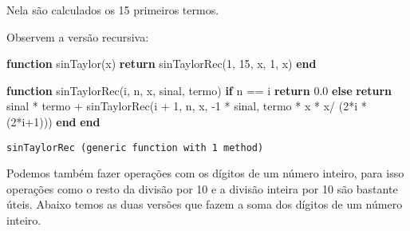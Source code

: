 \documentclass[
  letterpaper,
  DIV=11,
  numbers=noendperiod]{scrreprt}
\newenvironment{Shaded}{\begin{snugshade}}{\end{snugshade}}
\newcommand{\ControlFlowTok}[1]{\textcolor[rgb]{0.00,0.23,0.31}{\textbf{#1}}}
\newcommand{\FloatTok}[1]{\textcolor[rgb]{0.68,0.00,0.00}{#1}}
\newcommand{\FunctionTok}[1]{\textcolor[rgb]{0.28,0.35,0.67}{#1}}
\newcommand{\KeywordTok}[1]{\textcolor[rgb]{0.00,0.23,0.31}{\textbf{#1}}}
\newcommand{\NormalTok}[1]{\textcolor[rgb]{0.00,0.23,0.31}{#1}}
\newcommand{\OperatorTok}[1]{\textcolor[rgb]{0.37,0.37,0.37}{#1}}
\begin{document}
Nela são calculados os 15 primeiros termos.

Observem a versão recursiva:

\begin{Shaded}
\begin{Highlighting}[]
\KeywordTok{function} \FunctionTok{sinTaylor}\NormalTok{(x)}
    \ControlFlowTok{return} \FunctionTok{sinTaylorRec}\NormalTok{(}\FloatTok{1}\NormalTok{, }\FloatTok{15}\NormalTok{, x, }\FloatTok{1}\NormalTok{, x)}
\KeywordTok{end}

\KeywordTok{function} \FunctionTok{sinTaylorRec}\NormalTok{(i, n, x, sinal, termo)}
    \ControlFlowTok{if}\NormalTok{ n }\OperatorTok{==}\NormalTok{ i}
      \ControlFlowTok{return} \FloatTok{0.0}
    \ControlFlowTok{else}
      \ControlFlowTok{return}\NormalTok{ sinal }\OperatorTok{*}\NormalTok{ termo }\OperatorTok{+}
         \FunctionTok{sinTaylorRec}\NormalTok{(i }\OperatorTok{+} \FloatTok{1}\NormalTok{, n, x, }\OperatorTok{{-}}\FloatTok{1} \OperatorTok{*}\NormalTok{ sinal, termo }\OperatorTok{*}\NormalTok{ x }\OperatorTok{*}\NormalTok{ x}\OperatorTok{/}\NormalTok{ (}\FloatTok{2}\OperatorTok{*}\NormalTok{i }\OperatorTok{*}\NormalTok{ (}\FloatTok{2}\OperatorTok{*}\NormalTok{i}\OperatorTok{+}\FloatTok{1}\NormalTok{)))}
    \ControlFlowTok{end}
\KeywordTok{end}
\end{Highlighting}
\end{Shaded}

\begin{verbatim}
sinTaylorRec (generic function with 1 method)
\end{verbatim}

Podemos também fazer operações com os dígitos de um número inteiro, para
isso operações como o resto da divisão por 10 e a divisão inteira por 10
são bastante úteis. Abaixo temos as duas versões que fazem a soma dos
dígitos de um número inteiro.
\end{document}
